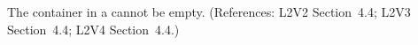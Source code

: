 The  container in a \UnitDefinition cannot be
empty.  (References: L2V2 Section~4.4; L2V3 Section~4.4; L2V4 Section~4.4.)
